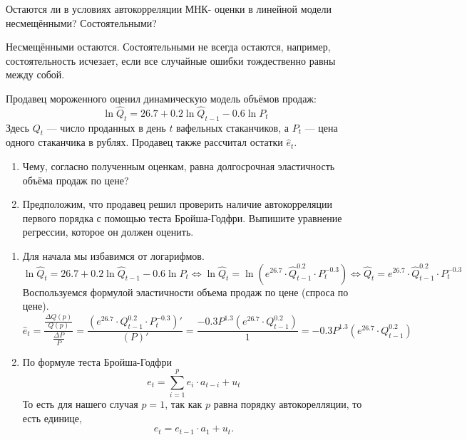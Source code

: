 \begin{problem}
Остаются ли в условиях автокорреляции МНК-
оценки в линейной модели несмещёнными? Состоятельными?
\begin{sol}
Несмещёнными остаются. Состоятельными не всегда остаются, например, состоятельность исчезает, если все случайные ошибки тождественно равны между собой.

\end{sol}
\end{problem}



\begin{problem}
Продавец мороженного оценил динамическую модель объёмов продаж:
\[
\ln \hat{Q}_t=26.7 + 0.2\ln \hat{Q}_{t-1}-0.6\ln P_t
\]
Здесь $Q_t$ — число проданных в день $t$ вафельных стаканчиков, а $P_t$ — цена одного стаканчика в рублях. Продавец также рассчитал остатки $\hat{e}_t$.
\begin{enumerate}
\item Чему, согласно полученным оценкам, равна долгосрочная эластичность объёма продаж по цене?
\item Предположим, что продавец решил проверить наличие автокорреляции первого порядка с помощью теста Бройша-Годфри. 
Выпишите уравнение регрессии, которое он должен оценить.
\end{enumerate}


\begin{sol}
  \begin{enumerate}
    \item Для начала мы избавимся от логарифмов.
  \[
    \ln \hat{Q}_t = 26.7 + 0.2 \ln \hat{Q}_{t-1} - 0.6\ln P_t 
  \Leftrightarrow 
  \ln \hat{Q}_t = \ln \left(e^{26.7} \cdot \hat{Q}_{t-1} ^ {0.2} \cdot P_t ^ {-0.3}\right) \Leftrightarrow 
  \hat{Q}_t = e^{26.7} \cdot \hat{Q}_{t-1} ^ {0.2} \cdot P_t ^ {-0.3}
  \]
  Воспользуемся формулой эластичности объема продаж по цене (спроса по цене).
  \[
    \hat{e}_t = \frac{\frac{\Delta Q(p)}{Q(p)}}{\frac{\Delta P}{P}} = \frac{(e^{26.7} \cdot Q_{t-1} ^ {0.2} \cdot P_t ^ {-0.3})'}{(P)'} = \frac{-0.3 P ^ {1.3}(e^{26.7} \cdot Q_{t-1} ^ {0.2})}{1} = -0.3 P ^ {1.3}(e^{26.7} \cdot Q_{t-1} ^ {0.2})
  \]
  \item По формуле теста Бройша-Годфри
  \[
    e_t = \sum_{i = 1}^p e_i \cdot a_{t-i} + u_t
  \]
  То есть для нашего случая $p = 1$, так как $p$ равна порядку автокорелляции, то есть единице,
  \[
    e_t =  e_{t-1} \cdot a_{1} + u_t.
  \]
\end{enumerate}
\end{sol}
\end{problem}


